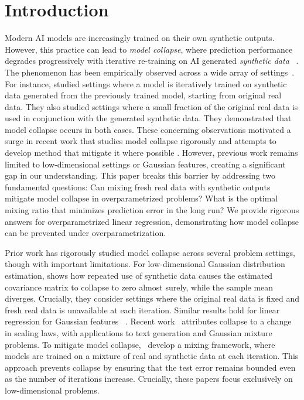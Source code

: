 \documentclass[10pt]{article}
\numberwithin{thm}{section}
\numberwithin{remark}{section}
\numberwithin{ex}{section}
\numberwithin{ass}{section}
\numberwithin{defn}{section}
\numberwithin{lemma}{section}
\numberwithin{corollary}{section}
\numberwithin{prop}{section}
\numberwithin{equation}{section}
\begin{document}
\section{Introduction}

Modern AI models are increasingly trained on their own synthetic outputs. However, this practice can lead to \emph{model collapse}, where prediction performance degrades progressively  with iterative re-training on AI generated \textit{synthetic data} ~\cite{shumailov2024ai,shumailov2023curse}. The phenomenon has been empirically observed across a wide array of settings~\cite{alemohammad2024self,bohacek2023nepotistically,briesch2023large,hataya2023will,martinez2023combining,martinez2023towards}. For instance, \cite{alemohammad2024self,shumailov2024ai,shumailov2023curse,martinez2023combining,martinez2023towards} studied settings where a model is iteratively trained on synthetic data generated from the previously trained model, starting from original real data. They also studied settings where a small fraction of the original real data is used in conjunction with the generated synthetic data. They demonstrated that model collapse occurs in both cases.
These concerning observations motivated a surge in recent work that studies model collapse rigorously and attempts to develop method that mitigate it where possible \cite{bertrand2024stability,shumailov2024ai,dohmatob2024model,dohmatob2024tale, dohmatob2024strong,feng2024beyond,dey2024universality,gerstgrasser2024inevitable,kazdan2024collapse}.
However, previous work remains limited to low-dimensional settings or Gaussian features, creating a significant gap in our understanding. This paper breaks this barrier by addressing two fundamental questions:
Can mixing fresh real data with synthetic outputs mitigate model collapse in overparametrized problems? What is the optimal mixing ratio that minimizes prediction error in the long run? We provide rigorous answers for overparametrized linear regression, demonstrating how model collapse can be prevented under overparametrization.

Prior work has rigorously studied model collapse across several problem settings, though with important limitations. For low-dimensional Gaussian distribution estimation, \cite{shumailov2024ai} shows how repeated use of synthetic data causes the estimated covariance matrix to collapse to zero almost surely, while the sample mean diverges. Crucially, they consider settings where the original real data is fixed and fresh real data is unavailable at each iteration. Similar results hold for linear regression for Gaussian features ~\cite{dohmatob2024model}. Recent work~\cite{dohmatob2024tale, dohmatob2024strong,feng2024beyond} attributes collapse to a change in scaling laws, with applications to text generation and Gaussian mixture problems.
To mitigate model collapse,~\cite{bertrand2024stability,gerstgrasser2024inevitable,dey2024universality,kazdan2024collapse,he2025golden} develop a mixing framework, where models are trained on a mixture of real and synthetic data at each iteration. This approach prevents collapse by ensuring that the test error remains bounded even as the number of iterations increase. Crucially, these papers focus exclusively on low-dimensional problems.
\end{document}

